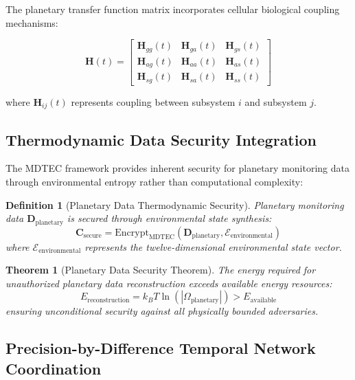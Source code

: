 \documentclass[12pt,a4paper]{article}
\newtheorem{theorem}{Theorem}
\newtheorem{definition}{Definition}
\begin{document}
The planetary transfer function matrix incorporates cellular biological coupling mechanisms:

\begin{equation}
\mathbf{H}(t) = \begin{bmatrix}
\mathbf{H}_{gg}(t) & \mathbf{H}_{ga}(t) & \mathbf{H}_{gs}(t) \\
\mathbf{H}_{ag}(t) & \mathbf{H}_{aa}(t) & \mathbf{H}_{as}(t) \\
\mathbf{H}_{sg}(t) & \mathbf{H}_{sa}(t) & \mathbf{H}_{ss}(t)
\end{bmatrix}
\end{equation}

where $\mathbf{H}_{ij}(t)$ represents coupling between subsystem $i$ and subsystem $j$.

\subsection{Thermodynamic Data Security Integration}

The MDTEC framework provides inherent security for planetary monitoring data through environmental entropy rather than computational complexity:

\begin{definition}[Planetary Data Thermodynamic Security]
Planetary monitoring data $\mathbf{D}_{\text{planetary}}$ is secured through environmental state synthesis:
\begin{equation}
\mathbf{C}_{\text{secure}} = \text{Encrypt}_{\text{MDTEC}}(\mathbf{D}_{\text{planetary}}, \mathcal{E}_{\text{environmental}})
\end{equation}
where $\mathcal{E}_{\text{environmental}}$ represents the twelve-dimensional environmental state vector.
\end{definition}

\begin{theorem}[Planetary Data Security Theorem]
The energy required for unauthorized planetary data reconstruction exceeds available energy resources:
\begin{equation}
E_{\text{reconstruction}} = k_B T \ln(|\Omega_{\text{planetary}}|) > E_{\text{available}}
\end{equation}
ensuring unconditional security against all physically bounded adversaries.
\end{theorem}

\subsection{Precision-by-Difference Temporal Network Coordination}
\end{document}
